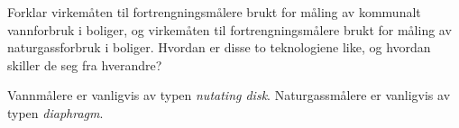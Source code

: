 

Forklar virkemåten til fortrengningsmålere brukt for måling av kommunalt vannforbruk i boliger, og virkemåten til fortrengningsmålere brukt for måling av naturgassforbruk i boliger. Hvordan er disse to teknologiene like, og hvordan skiller de seg fra hverandre?







Vannmålere er vanligvis av typen {\it nutating disk}. Naturgassmålere er vanligvis av typen {\it diaphragm}.










